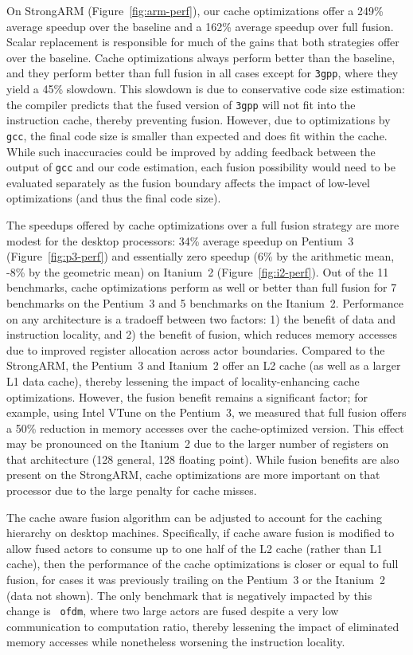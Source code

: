 On StrongARM (Figure~\ref{fig:arm-perf}), our cache optimizations
offer a 249\% average speedup over the baseline and a 162\% average
speedup over full fusion.  Scalar replacement is responsible for much
of the gains that both strategies offer over the baseline.  Cache
optimizations always perform better than the baseline, and they
perform better than full fusion in all cases except for \texttt{3gpp},
where they yield a 45\% slowdown.  This slowdown is due to
conservative code size estimation: the compiler predicts that the
fused version of \texttt{3gpp} will not fit into the instruction
cache, thereby preventing fusion.  However, due to optimizations by
{\tt gcc}, the final code size is smaller than expected and does fit
within the cache.  While such inaccuracies could be improved by adding
feedback between the output of {\tt gcc} and our code estimation, each
fusion possibility would need to be evaluated separately as the fusion
boundary affects the impact of low-level optimizations (and thus the
final code size).

The speedups offered by cache optimizations over a full fusion
strategy are more modest for the desktop processors: 34\% average
speedup on Pentium~3 (Figure~\ref{fig:p3-perf}) and essentially zero
speedup (6\% by the arithmetic mean, -8\% by the geometric mean) on
Itanium~2 (Figure~\ref{fig:i2-perf}).  Out of the 11 benchmarks, cache
optimizations perform as well or better than full fusion for 7
benchmarks on the Pentium~3 and 5 benchmarks on the Itanium~2.
Performance on any architecture is a tradoeff between two factors: 1)
the benefit of data and instruction locality, and 2) the benefit of
fusion, which reduces memory accesses due to improved register
allocation across actor boundaries.  Compared to the StrongARM, the
Pentium~3 and Itanium~2 offer an L2 cache (as well as a larger L1 data
cache), thereby lessening the impact of locality-enhancing cache
optimizations.  However, the fusion benefit remains a significant
factor; for example, using Intel VTune on the Pentium~3, we measured
that full fusion offers a 50\% reduction in memory accesses over the
cache-optimized version.  This effect may be pronounced on the Itanium~2
due to the larger number of registers on that architecture (128
general, 128 floating point).  While fusion benefits are also present
on the StrongARM, cache optimizations are more important on that processor
due to the large penalty for cache misses.

The cache aware fusion algorithm can be adjusted to account for the
caching hierarchy on desktop machines.  Specifically, if cache aware
fusion is modified to allow fused actors to consume up to one half of
the L2 cache (rather than L1 cache), then the performance of the cache
optimizations is closer or equal to full fusion, for cases it was
previously trailing on the Pentium~3 or the Itanium~2 (data not shown).  The
only benchmark that is negatively impacted by this change is {\tt
ofdm}, where two large actors are fused despite a very low
communication to computation ratio, thereby lessening the impact of
eliminated memory accesses while nonetheless worsening the instruction
locality.

